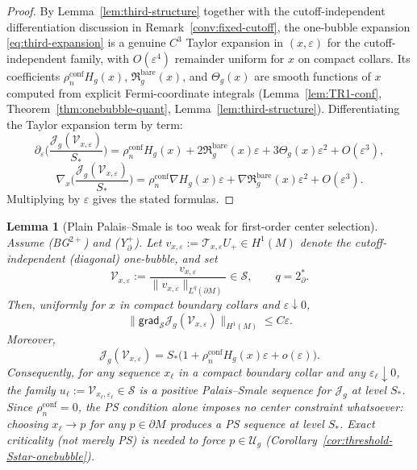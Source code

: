 \documentclass[11pt,reqno,a4paper]{amsart}
\numberwithin{equation}{section}
\theoremstyle{plain}
\newtheorem{lemma}[theorem]{Lemma}
\theoremstyle{remark}
\theoremstyle{plain}
\begin{document}
\begin{proof}
By Lemma~\ref{lem:third-structure} together with the cutoff-independent differentiation discussion
in Remark~\ref{conv:fixed-cutoff}, the one-bubble expansion \eqref{eq:third-expansion}
is a genuine $C^3$ Taylor expansion in $(x,\varepsilon)$ for the cutoff-independent family, with
$O(\varepsilon^4)$ remainder uniform for $x$ on compact collars.
Its coefficients $\rho_n^{\mathrm{conf}}H_g(x)$,
$\mathfrak R_g^{\mathrm{bare}}(x)$, and $\Theta_g(x)$
are smooth functions of $x$ computed from explicit Fermi-coordinate integrals
(Lemma~\ref{lem:TR1-conf}, Theorem~\ref{thm:onebubble-quant},
Lemma~\ref{lem:third-structure}).
Differentiating the Taylor expansion term by term:
\[
\partial_\varepsilon\Big(\frac{\mathcal J_g(\mathcal V_{x,\varepsilon})}{S_\ast}\Big)
=\rho_n^{\mathrm{conf}}H_g(x)+2\mathfrak R_g^{\mathrm{bare}}(x)\varepsilon
+3\Theta_g(x)\varepsilon^2+O(\varepsilon^3),
\]
\[
\nabla_x\Big(\frac{\mathcal J_g(\mathcal V_{x,\varepsilon})}{S_\ast}\Big)
=\rho_n^{\mathrm{conf}}\nabla H_g(x)\varepsilon
+\nabla\mathfrak R_g^{\mathrm{bare}}(x)\varepsilon^2+O(\varepsilon^3).
\]
Multiplying by $\varepsilon$ gives the stated formulas.
\end{proof}


\begin{lemma}[Plain Palais--Smale is too weak for first-order center selection]\label{lem:PS-obstruction}
Assume \textup{(BG$^{2+}$)} and \textup{(Y$^+_{\partial}$)}.
Let $v_{x,\varepsilon}:=\mathcal T_{x,\varepsilon}U_+\in H^1(M)$ denote the
cutoff-independent (diagonal) one-bubble, and set
\[
\mathcal V_{x,\varepsilon}:=\frac{v_{x,\varepsilon}}{\|v_{x,\varepsilon}\|_{L^q(\partial M)}}
\in\mathcal S,
\qquad q=2^*_\partial.
\]
Then, uniformly for $x$ in compact boundary collars and $\varepsilon\downarrow0$,
\begin{equation}\label{eq:PS-obstruction-grad}
\|\mathsf{grad}_{\mathcal S}\mathcal J_g(\mathcal V_{x,\varepsilon})\|_{H^1(M)}
\le C\varepsilon.
\end{equation}
Moreover,
\[
\mathcal J_g(\mathcal V_{x,\varepsilon})
=
S_\ast\Big(1+\rho_n^{\mathrm{conf}}H_g(x)\varepsilon+o(\varepsilon)\Big).
\]
Consequently, for any sequence $x_\ell$ in a compact boundary collar and any
$\varepsilon_\ell\downarrow0$, the family
$u_\ell:=\mathcal V_{x_\ell,\varepsilon_\ell}\in\mathcal S$
is a positive Palais--Smale sequence for $\mathcal J_g$ at level $S_\ast$.
Since $\rho_n^{\mathrm{conf}}=0$, the PS condition alone imposes no
center constraint whatsoever: choosing $x_\ell\to p$ for \emph{any}
$p\in\partial M$ produces a PS sequence at level $S_\ast$.
Exact criticality (not merely PS) is needed to force
$p\in\mathcal U_g$ (Corollary~\ref{cor:threshold-Sstar-onebubble}).
\end{lemma}
\end{document}
